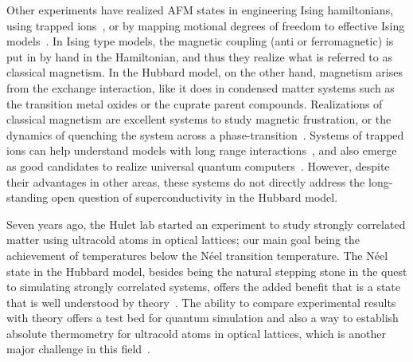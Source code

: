 \documentclass[oneside,11pt]{memoir}
\begin{document}
Other experiments have realized AFM states in engineering Ising hamiltonians,
using trapped ions~\cite{Kim2010,Britton2012}, or by mapping motional degrees
of freedom to effective Ising models~\cite{Simon2011, Struck19082011}.  In
Ising type models, the magnetic coupling (anti or ferromagnetic) is put in by
hand in the Hamiltonian, and thus they realize what is referred to as classical
magnetism.  In the Hubbard model, on the other hand,  magnetism arises from the
exchange interaction, like it does in condensed matter systems such as the
transition metal oxides or the cuprate parent compounds.  Realizations of
classical magnetism are excellent systems to study magnetic frustration, or the
dynamics of quenching the system across a
phase-transition~\cite{PhysRevLett.111.053003}.   Systems of trapped ions can
help understand models with long range interactions~\cite{Richerme2014}, and
also emerge as good candidates to realize universal quantum
computers~\cite{Britton2012}.  However, despite their advantages in other
areas, these systems do not directly address the long-standing open question of
superconductivity in the Hubbard model.


Seven years ago, the Hulet lab started an experiment to study strongly
correlated matter using ultracold atoms in optical lattices; our main goal
being the achievement of temperatures below the N\'{e}el transition
temperature.  The N\'{e}el state in the Hubbard model,  besides being the
natural stepping stone in the quest to simulating strongly correlated systems,
offers the added benefit that is a state that is well understood by
theory~\cite{Paiva2011, Fuchs2011}.   The ability to compare experimental
results with theory offers a test bed for quantum simulation and also a way to
establish absolute thermometry for ultracold atoms in optical lattices,  which
is another major challenge in this field~\cite{McKay2011}.  


\end{document}
